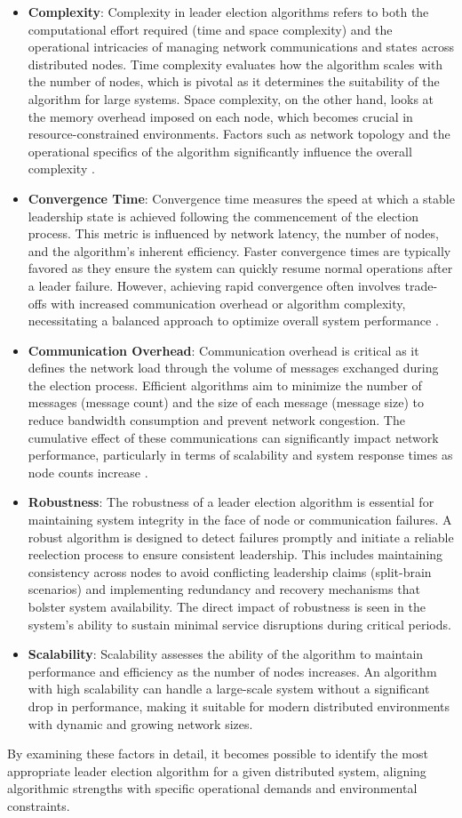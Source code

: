 \begin{itemize}
    \item \textbf{Complexity}: Complexity in leader election algorithms refers to both the computational effort required (time and space complexity) and the operational intricacies of managing network communications and states across distributed nodes. Time complexity evaluates how the algorithm scales with the number of nodes, which is pivotal as it determines the suitability of the algorithm for large systems. Space complexity, on the other hand, looks at the memory overhead imposed on each node, which becomes crucial in resource-constrained environments. Factors such as network topology and the operational specifics of the algorithm significantly influence the overall complexity \cite{Ref6}.
    \item \textbf{Convergence Time}: Convergence time measures the speed at which a stable leadership state is achieved following the commencement of the election process. This metric is influenced by network latency, the number of nodes, and the algorithm’s inherent efficiency. Faster convergence times are typically favored as they ensure the system can quickly resume normal operations after a leader failure. However, achieving rapid convergence often involves trade-offs with increased communication overhead or algorithm complexity, necessitating a balanced approach to optimize overall system performance \cite{Ref7}.
    \item \textbf{Communication Overhead}: Communication overhead is critical as it defines the network load through the volume of messages exchanged during the election process. Efficient algorithms aim to minimize the number of messages (message count) and the size of each message (message size) to reduce bandwidth consumption and prevent network congestion. The cumulative effect of these communications can significantly impact network performance, particularly in terms of scalability and system response times as node counts increase \cite{Ref8}.
    \item \textbf{Robustness}: The robustness of a leader election algorithm is essential for maintaining system integrity in the face of node or communication failures. A robust algorithm is designed to detect failures promptly and initiate a reliable reelection process to ensure consistent leadership. This includes maintaining consistency across nodes to avoid conflicting leadership claims (split-brain scenarios) and implementing redundancy and recovery mechanisms that bolster system availability. The direct impact of robustness is seen in the system's ability to sustain minimal service disruptions during critical periods.
    \item \textbf{Scalability}: Scalability assesses the ability of the algorithm to maintain performance and efficiency as the number of nodes increases. An algorithm with high scalability can handle a large-scale system without a significant drop in performance, making it suitable for modern distributed environments with dynamic and growing network sizes.


\end{itemize}
By examining these factors in detail, it becomes possible to identify the most appropriate leader election algorithm for a given distributed system, aligning algorithmic strengths with specific operational demands and environmental constraints.

